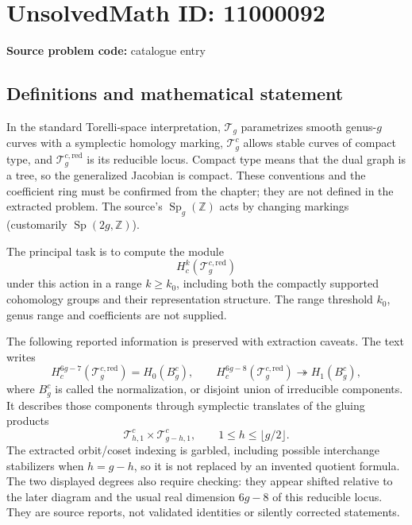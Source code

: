 \documentclass[11pt]{article}
\newcommand{\Z}{\mathbb{Z}}
\begin{document}
\section*{UnsolvedMath ID: 11000092}
\textbf{Source problem code:} catalogue entry
\subsection{Definitions and mathematical statement}
In the standard Torelli-space interpretation, \(\mathcal T_g\) parametrizes smooth genus-\(g\) curves with a symplectic homology marking, \(\mathcal T_g^c\) allows stable curves of compact type, and \(\mathcal T_g^{c,\mathrm{red}}\) is its reducible locus. Compact type means that the dual graph is a tree, so the generalized Jacobian is compact. These conventions and the coefficient ring must be confirmed from the chapter; they are not defined in the extracted problem. The source's \(\operatorname{Sp}_g(\Z)\) acts by changing markings (customarily \(\operatorname{Sp}(2g,\Z)\)).

The principal task is to compute the module
\[H_c^k(\mathcal T_g^{c,\mathrm{red}})\]
under this action in a range \(k\geq k_0\), including both the compactly supported cohomology groups and their representation structure. The range threshold \(k_0\), genus range and coefficients are not supplied.

The following reported information is preserved with extraction caveats. The text writes
\[H_c^{6g-7}(\mathcal T_g^{c,\mathrm{red}})=H_0(B_g^c),\qquad
H_c^{6g-8}(\mathcal T_g^{c,\mathrm{red}})\twoheadrightarrow H_1(B_g^c),\]
where \(B_g^c\) is called the normalization, or disjoint union of irreducible components. It describes those components through symplectic translates of the gluing products
\[\mathcal T_{h,1}^c\times\mathcal T_{g-h,1}^c,
\qquad1\leq h\leq\lfloor g/2\rfloor.\]
The extracted orbit/coset indexing is garbled, including possible interchange stabilizers when \(h=g-h\), so it is not replaced by an invented quotient formula. The two displayed degrees also require checking: they appear shifted relative to the later diagram and the usual real dimension \(6g-8\) of this reducible locus. They are source reports, not validated identities or silently corrected statements.
\end{document}
